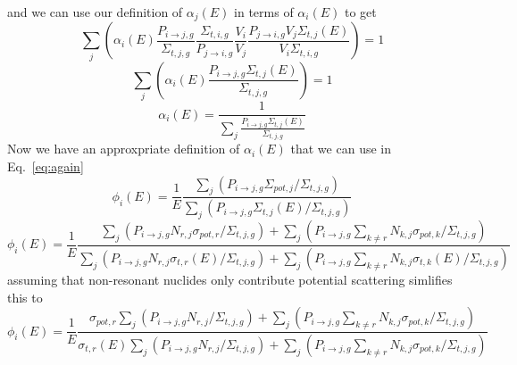 \documentclass[10pt]{article}
\begin{document}
      and we can use our definition of $\alpha_j(E)$ in terms of $\alpha_i(E)$ to get 
    \begin{equation}\sum\limits_{j}\left(\alpha_{i}(E)\frac{P_{i\rightarrow j,g}}{\Sigma_{t,j,g}}\frac{\Sigma_{t,i,g}}{P_{j\rightarrow i,g}}\frac{V_{i}}{V_{j}}\frac{P_{j\rightarrow i,g}V_{j}\Sigma_{t,j}(E)}{V_{i}\Sigma_{t,i,g}}\right)=1\end{equation}
    \begin{equation}\sum\limits_{j}\left(\alpha_{i}(E)\frac{P_{i\rightarrow j,g}\Sigma_{t,j}(E)}{\Sigma_{t,j,g}}\right)=1\end{equation}
      \begin{equation}\alpha_i(E)=\frac{1}{\sum\limits_{j}\frac{P_{i\rightarrow j,g}\Sigma_{t,j}(E)}{\Sigma_{t,j,g}}}\end{equation}
        Now we have an approxpriate definition of $\alpha_i(E)$ that we can use in Eq.~\ref{eq:again}
  \begin{equation}\phi_{i}(E)=\frac{1}{E}\frac{\sum\limits_j\left(P_{i\rightarrow j,g}\Sigma_{pot,j}\Big/\Sigma_{t,j,g}\right)}{\sum\limits_{j}\left(P_{i\rightarrow j,g}\Sigma_{t,j}(E)\Big/\Sigma_{t,j,g}\right)}\end{equation}
    \begin{equation}\phi_{i}(E)=\frac{1}{E}\frac{\sum\limits_j\left(P_{i\rightarrow j,g}N_{r,j}\sigma_{pot,r}\Big/\Sigma_{t,j,g}\right) +\sum\limits_j\left(P_{i\rightarrow j,g}\sum\limits_{k\neq r}N_{k,j}\sigma_{pot,k}\Big/\Sigma_{t,j,g}\right) }{
    \sum\limits_{j}\left(P_{i\rightarrow j,g}N_{r,j}\sigma_{t,r}(E)\Big/\Sigma_{t,j,g}\right) + \sum\limits_{j}\left(P_{i\rightarrow j,g}\sum\limits_{k\neq r}N_{k,j}\sigma_{t,k}(E)\Big/\Sigma_{t,j,g}\right)}\end{equation}
assuming that non-resonant nuclides only contribute potential scattering simlifies this to 
    \begin{equation}\phi_{i}(E)=\frac{1}{E}\frac{\sigma_{pot,r}\sum\limits_j\left(P_{i\rightarrow j,g}N_{r,j}\Big/\Sigma_{t,j,g}\right) +\sum\limits_j\left(P_{i\rightarrow j,g}\sum\limits_{k\neq r}N_{k,j}\sigma_{pot,k}\Big/\Sigma_{t,j,g}\right) }{
    \sigma_{t,r}(E)\sum\limits_{j}\left(P_{i\rightarrow j,g}N_{r,j}\Big/\Sigma_{t,j,g}\right) + \sum\limits_{j}\left(P_{i\rightarrow j,g}\sum\limits_{k\neq r}N_{k,j}\sigma_{pot,k}\Big/\Sigma_{t,j,g}\right)}\end{equation}
\end{document}
